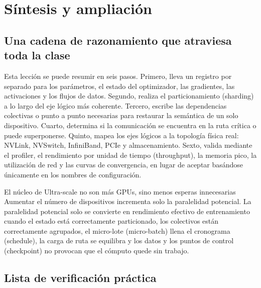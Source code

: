 \documentclass[a4paper]{article}
\begin{document}
\section{Síntesis y ampliación}

\subsection{Una cadena de razonamiento que atraviesa toda la clase}

Esta lección se puede resumir en seis pasos. Primero, lleva un registro por separado para los parámetros, el estado del optimizador, las gradientes, las activaciones y los flujos de datos. Segundo, realiza el particionamiento (sharding) a lo largo del eje lógico más coherente. Tercero, escribe las dependencias colectivas o punto a punto necesarias para restaurar la semántica de un solo dispositivo. Cuarto, determina si la comunicación se encuentra en la ruta crítica o puede superponerse. Quinto, mapea los ejes lógicos a la topología física real: NVLink, NVSwitch, InfiniBand, PCIe y almacenamiento. Sexto, valida mediante el profiler, el rendimiento por unidad de tiempo (throughput), la memoria pico, la utilización de red y las curvas de convergencia, en lugar de aceptar basándose únicamente en los nombres de configuración.

\begin{importantbox}{El núcleo de Ultra-scale no son más GPUs, sino menos esperas innecesarias}
Aumentar el número de dispositivos incrementa solo la paralelidad potencial. La paralelidad potencial solo se convierte en rendimiento efectivo de entrenamiento cuando el estado está correctamente particionado, los colectivos están correctamente agrupados, el micro-lote (micro-batch) llena el cronograma (schedule), la carga de ruta se equilibra y los datos y los puntos de control (checkpoint) no provocan que el cómputo quede sin trabajo.
\end{importantbox}

\subsection{Lista de verificación práctica}
\end{document}
